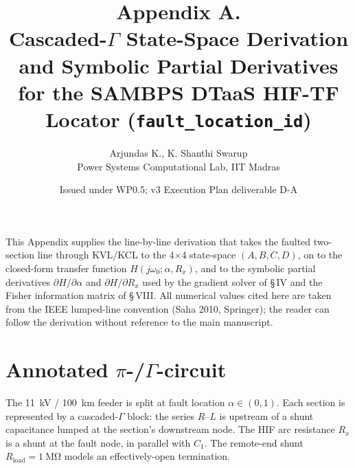 \documentclass[11pt,a4paper]{article}
\title{Appendix A.\\[2pt]
       Cascaded-$\Gamma$ State-Space Derivation\\
       and Symbolic Partial Derivatives\\[6pt]
       \large for the SAMBPS DTaaS HIF-TF Locator (\texttt{fault\_location\_id})}
\author{Arjundas K., K. Shanthi Swarup\\[1pt]
        \small Power Systems Computational Lab, IIT Madras}
\date{Issued under WP0.5; v3 Execution Plan deliverable D-A}
\begin{document}
\maketitle

\noindent
This Appendix supplies the line-by-line derivation that takes the
faulted two-section line through KVL/KCL to the 4$\times$4 state-space
$(A, B, C, D)$, on to the closed-form transfer function
$H(j\omega_0; \alpha, R_x)$, and to the symbolic partial derivatives
$\partial H/\partial\alpha$ and $\partial H/\partial R_x$ used by the
gradient solver of \S\,IV and the Fisher information matrix of
\S\,VIII.  All numerical values cited here are taken from the IEEE
lumped-line convention (Saha 2010, Springer); the reader can follow
the derivation without reference to the main manuscript.

\section{Annotated $\pi$-/$\Gamma$-circuit}\label{sec:circuit}

The 11~kV / 100~km feeder is split at fault location $\alpha\in(0,1)$.
Each section is represented by a cascaded-$\Gamma$ block: the series
$R$--$L$ is upstream of a shunt capacitance lumped at the section's
downstream node.  The HIF arc resistance $R_x$ is a shunt at the
fault node, in parallel with $C_1$.  The remote-end shunt $R_{\text{load}}
\!=\!\SI{1}{\mega\ohm}$ models an effectively-open termination.
\end{document}
